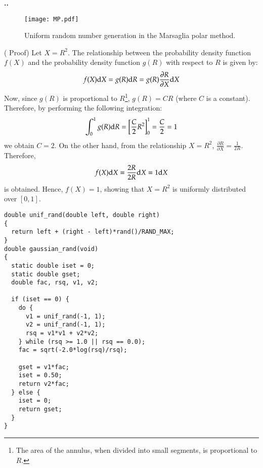 \documentclass[aspectratio=169,dvipdfmx,cjk,handout,hyperref,8pt]{beamer} %
\newcommand{\TK}[1]{{\bf \color{red} #1}}
\theoremstyle{example}
\begin{document}
\begin{frame}{\bf\thesection.\thesubsection.~\insertsubsection}
\begin{figure}
\texttt{[image: MP.pdf]}
\caption{Uniform random number generation in the Marsaglia polar method.}
\label{fig:fig0}
\end{figure}

\newpage
( Proof)\newline
Let $X = R ^ 2 $. The relationship between the probability density function $f (X)$ and the probability density function $g(R)$ with respect to $R$ is given by:
\begin{eqnarray}
f(X){\rm d}X = g(R) {\rm d}R = g(R) \frac{\partial R}{\partial X}{\rm d}X
\end{eqnarray}
Now, since $g(R)$ is proportional to $R$\footnote{The area of the annulus, when divided into small segments, is proportional to $R$.}, $g (R) = CR $ (where $C$ is a constant). Therefore, by performing the following integration:
\begin{eqnarray}
\int_0^1g (R) {\rm d} R = \left [\frac {C} {2}R^2 \right]_0^1 = \frac {C}{2} = 1 
\end{eqnarray}
we obtain $C = 2$. On the other hand, from the relationship $X = R ^ 2 $, $\frac{\partial R}{\partial X}=\frac{1}{2 R}$. Therefore,
\begin{eqnarray}
f(X){\rm d}X= \frac{2R}{2R}{\rm d}X= 1{\rm d}X
\end{eqnarray}
is obtained. Hence, $f(X)=1$, showing that $X=R^2$ is uniformly distributed over $[0,1]$.

\begin{lstlisting}[basicstyle=\ttfamily\small, breaklines=true, frame=single,caption= Normal Random Number Generation Algorithm (Box-Muller Method) The following program "BM.h" can be obtained from the GitHub repository \href{https://github.com/TakeshiKawasaki/2024-simulation-tutorial/tree/main}{\TK{\underbar{[Link]}}}. It can be used as a subroutine or included as a header.]
double unif_rand(double left, double right)
{
  return left + (right - left)*rand()/RAND_MAX;
}
double gaussian_rand(void)
{
  static double iset = 0;
  static double gset;
  double fac, rsq, v1, v2;

  if (iset == 0) {
    do {
      v1 = unif_rand(-1, 1);
      v2 = unif_rand(-1, 1);
      rsq = v1*v1 + v2*v2;
    } while (rsq >= 1.0 || rsq == 0.0);
    fac = sqrt(-2.0*log(rsq)/rsq);

    gset = v1*fac;
    iset = 0.50;
    return v2*fac;
  } else {
    iset = 0;
    return gset;
  }
}
\end{lstlisting}
\end{frame}
\end{document}
